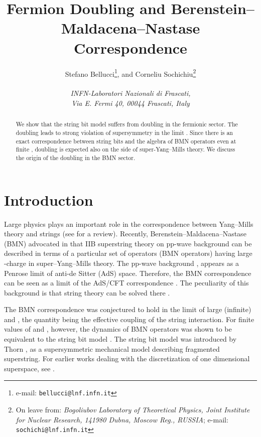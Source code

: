 \documentclass[a4paper]{article}
\begin{document}
\title{Fermion Doubling and Berenstein--Maldacena--Nastase Correspondence}
\author{Stefano Bellucci\thanks{e-mail:
\texttt{bellucci@lnf.infn.it}}, and Corneliu Sochichiu\thanks{On
leave from: \textit{Bogoliubov Laboratory of Theoretical Physics,
Joint Institute for Nuclear Research, 141980 Dubna, Moscow Reg.,
RUSSIA}; e-mail: \texttt{sochichi@lnf.infn.it}}
\\
\\
{\it INFN-Laboratori Nazionali di Frascati,}\\
{\it Via E. Fermi 40, 00044 Frascati, Italy}}


\maketitle
\begin{abstract}
We show that the string bit model suffers from doubling in the
fermionic sector. The doubling leads to strong violation of
supersymmetry in the limit \coordHE{}. Since there is an exact
correspondence between string bits and the algebra of BMN
operators even at finite \coordHE{}, doubling is expected also on the
side of super-Yang--Mills theory. We discuss the origin of the
doubling in the BMN sector.
\end{abstract}


\section{Introduction}

Large \coordHE{} physics \cite{'tHooft:1974jz,'tHooft:2002yn} plays an
important role in the correspondence between Yang--Mills theory
and strings (see \cite{Aharony:1999ti} for a review).
Recently, Berenstein--Maldacena--Nastase (BMN) advocated in
\cite{Berenstein:2002jq,Berenstein:2002sa,Berenstein:2002zw} that
IIB superstring theory on pp-wave background can be described in
terms of a particular set of operators (BMN operators) having
large \coordHE{}-charge \coordHE{} in super--Yang--Mills theory. The pp-wave
background \cite{Blau:2001ne,Blau:2002dy,Blau:2002mw}, appears as
a Penrose limit of anti-de Sitter (AdS) space. Therefore, the BMN
correspondence can be seen as a limit of the AdS/CFT correspondence
\cite{Maldacena:1998re,Gubser:1998bc}. The peculiarity of this
background is that string theory can be solved there
\cite{Metsaev:2001bj,Metsaev:2002re}.

The BMN correspondence was conjectured to hold in the limit of
large (infinite) \coordHE{} and \coordHE{}, the quantity \coordHE{} being
the effective coupling of the string interaction. For finite
values of \coordHE{} and \coordHE{}, however, the dynamics of BMN operators was
shown to be equivalent to the string bit model
\cite{Thorn:1997jy,Verlinde:2002ig,Zhou:2002mi,Vaman:2002ka,Pearson:2002zs}.
The string bit model was introduced by Thorn \cite{Thorn:1997jy},
as a supersymmetric mechanical model describing fragmented
superstring. For earlier works dealing with the discretization of one
dimensional superspace, see \cite{B23,B22,B21}.
\end{document}
